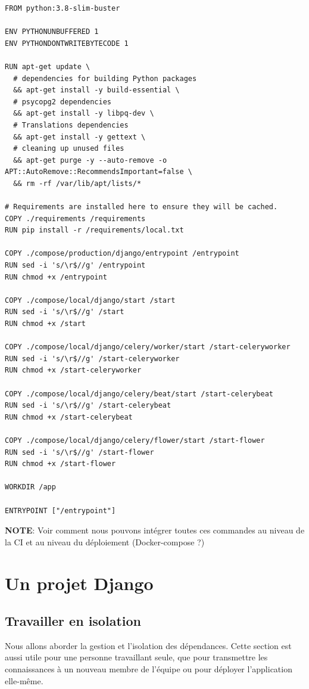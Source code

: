 \documentclass[11pt]{amsbook}
\newcommand{\admonition}[2]{\textbf{#1}: {#2}}
\begin{document}
\begin{verbatim}
FROM python:3.8-slim-buster

ENV PYTHONUNBUFFERED 1
ENV PYTHONDONTWRITEBYTECODE 1

RUN apt-get update \
  # dependencies for building Python packages
  && apt-get install -y build-essential \
  # psycopg2 dependencies
  && apt-get install -y libpq-dev \
  # Translations dependencies
  && apt-get install -y gettext \
  # cleaning up unused files
  && apt-get purge -y --auto-remove -o APT::AutoRemove::RecommendsImportant=false \
  && rm -rf /var/lib/apt/lists/*

# Requirements are installed here to ensure they will be cached.
COPY ./requirements /requirements
RUN pip install -r /requirements/local.txt

COPY ./compose/production/django/entrypoint /entrypoint
RUN sed -i 's/\r$//g' /entrypoint
RUN chmod +x /entrypoint

COPY ./compose/local/django/start /start
RUN sed -i 's/\r$//g' /start
RUN chmod +x /start

COPY ./compose/local/django/celery/worker/start /start-celeryworker
RUN sed -i 's/\r$//g' /start-celeryworker
RUN chmod +x /start-celeryworker

COPY ./compose/local/django/celery/beat/start /start-celerybeat
RUN sed -i 's/\r$//g' /start-celerybeat
RUN chmod +x /start-celerybeat

COPY ./compose/local/django/celery/flower/start /start-flower
RUN sed -i 's/\r$//g' /start-flower
RUN chmod +x /start-flower

WORKDIR /app

ENTRYPOINT ["/entrypoint"]
\end{verbatim}

\admonition{NOTE}{Voir comment nous pouvons intégrer toutes ces commandes au niveau de la CI et au niveau du déploiement (Docker-compose ?)}
\hypertarget{x-un-projet-django}{\chapter{Un projet Django}}
\hypertarget{x-travailler-en-isolation}{\section{Travailler en isolation}}
Nous allons aborder la gestion et l’isolation des dépendances.
Cette section est aussi utile pour une personne travaillant seule, que pour transmettre les connaissances à un nouveau membre de l’équipe ou pour déployer l’application elle-même.
\end{document}
